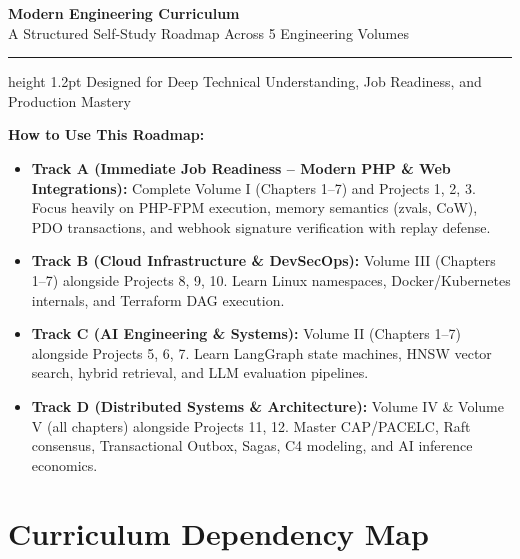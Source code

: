 \documentclass[11pt,oneside]{book}
\begin{document}
\frontmatter
\pagestyle{empty}

\begin{center}
  \vspace*{2cm}
  {\Huge\sffamily\bfseries\color{headingblue} Modern Engineering Curriculum}\\[12pt]
  {\Large\sffamily\color{gray} A Structured Self-Study Roadmap Across 5 Engineering Volumes}\\[30pt]
  \hrule height 1.2pt
  \vspace*{25pt}
  {\normalsize\sffamily Designed for Deep Technical Understanding, Job Readiness, and Production Mastery}
\end{center}

\vspace{3cm}

\begin{tcolorbox}[
  enhanced,
  colback=white,
  colframe=gray!30!white,
  boxrule=0.8pt,
  arc=2pt,
  left=15pt,right=15pt,top=12pt,bottom=12pt
]
\sffamily\small
\textbf{How to Use This Roadmap:}
\begin{itemize}[leftmargin=15pt]
  \item \textbf{Track A (Immediate Job Readiness -- Modern PHP \& Web Integrations):} Complete Volume I (Chapters 1--7) and Projects 1, 2, 3. Focus heavily on PHP-FPM execution, memory semantics (zvals, CoW), PDO transactions, and webhook signature verification with replay defense.
  \item \textbf{Track B (Cloud Infrastructure \& DevSecOps):} Volume III (Chapters 1--7) alongside Projects 8, 9, 10. Learn Linux namespaces, Docker/Kubernetes internals, and Terraform DAG execution.
  \item \textbf{Track C (AI Engineering \& Systems):} Volume II (Chapters 1--7) alongside Projects 5, 6, 7. Learn LangGraph state machines, HNSW vector search, hybrid retrieval, and LLM evaluation pipelines.
  \item \textbf{Track D (Distributed Systems \& Architecture):} Volume IV \& Volume V (all chapters) alongside Projects 11, 12. Master CAP/PACELC, Raft consensus, Transactional Outbox, Sagas, C4 modeling, and AI inference economics.
\end{itemize}
\end{tcolorbox}

\newpage
\pagestyle{fancy}
\mainmatter

\chapter*{Curriculum Dependency Map}
\end{document}
